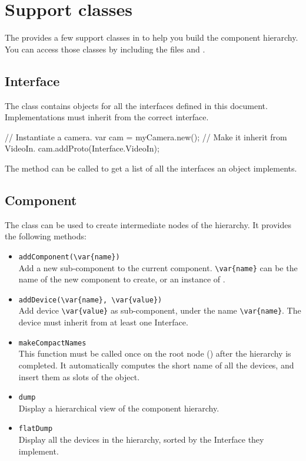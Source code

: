 \section{Support classes}
The \usdk provides a few support classes in \us to help you build the component
hierarchy. You can access those classes by including the files
 and .

\subsection{Interface}
The  class contains \us objects for all the interfaces defined
in this document. Implementations must inherit from the correct interface.

\begin{urbiunchecked}
// Instantiate a camera.
var cam = myCamera.new();
// Make it inherit from VideoIn.
cam.addProto(Interface.VideoIn);
\end{urbiunchecked}

The  method can be called to get a list of all
the interfaces an object implements.

\subsection{Component}
The  class can be used to create intermediate nodes of the
hierarchy. It provides the following methods:

\begin{itemize}

\item \lstinline|addComponent(\var{name})|\\
  Add a new sub-component to the current component. \lstinline|\var{name}| can
  be the name of the new component to create, or an instance of
  .

\item \lstinline|addDevice(\var{name}, \var{value})|\\
  Add device \lstinline|\var{value}| as sub-component, under the name
  \lstinline|\var{name}|. The device must inherit from at least one Interface.

\item \lstinline|makeCompactNames| \\
  This function must be called once on the root node () after the
  hierarchy is completed.
  It automatically computes the short name of all the devices, and insert them as
  slots of the  object.

\item \lstinline|dump| \\
  Display a hierarchical view of the component hierarchy.

\item \lstinline|flatDump| \\
  Display all the devices in the hierarchy, sorted by the Interface they
  implement.

\end{itemize}

